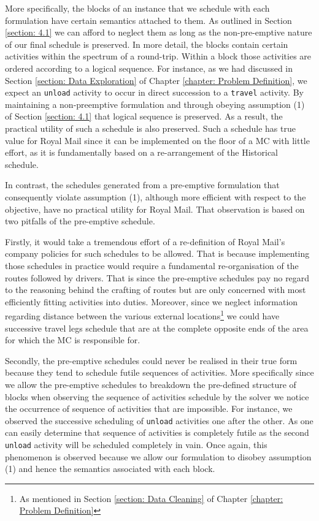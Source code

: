 \vspace{\baselineskip}
\noindent
More specifically, the blocks of an instance that we schedule with each formulation have certain semantics attached to them. As outlined in Section \ref{section: 4.1} we can afford to neglect them as long as the non-pre-emptive nature of our final schedule is preserved. In more detail, the blocks contain certain activities within the spectrum of a round-trip. Within a block those activities are ordered according to a logical sequence. For instance, as we had discussed in Section \ref{section: Data Exploration} of Chapter \ref{chapter: Problem Definition}, we expect an \texttt{unload} activity to occur in direct succession to a \texttt{travel} activity. By maintaining a non-preemptive formulation and through obeying assumption (1) of Section \ref{section: 4.1} that logical sequence is preserved. As a result, the practical utility of such a schedule is also preserved. Such a schedule has true value for Royal Mail since it can be implemented on the floor of a MC with little effort, as it is fundamentally based on a re-arrangement of the Historical schedule.

\vspace{\baselineskip}
\noindent
In contrast, the schedules generated from a pre-emptive formulation that consequently violate assumption (1), although more efficient with respect to the objective, have no practical utility for Royal Mail. That observation is based on two pitfalls of the pre-emptive schedule.

\vspace{\baselineskip}
\noindent
Firstly, it would take a tremendous effort of a re-definition of Royal Mail's company policies for such schedules to be allowed. That is because implementing those schedules in practice would require a fundamental re-organisation of the routes followed by drivers. That is since the pre-emptive schedules pay no regard to the reasoning behind the crafting of routes but are only concerned with most efficiently fitting activities into duties. Moreover, since we neglect information regarding distance between the various external locations\footnote{As mentioned in Section \ref{section: Data Cleaning} of Chapter \ref{chapter: Problem Definition}} we could have successive travel legs schedule that are at the complete opposite ends of the area for which the MC is responsible for.

\vspace{\baselineskip}
\noindent
Secondly, the pre-emptive schedules could never be realised in their true form because they tend to schedule futile sequences of activities. More specifically since we allow the pre-emptive schedules to breakdown the pre-defined structure of blocks when observing the sequence of activities schedule by the solver we notice the occurrence of sequence of activities that are impossible. For instance, we observed the successive scheduling of \texttt{unload} activities one after the other. As one can easily determine that sequence of activities is completely futile as the second \texttt{unload} activity will be scheduled completely in vain. Once again, this phenomenon is observed because we allow our formulation to disobey assumption (1) and hence the semantics associated with each block.

